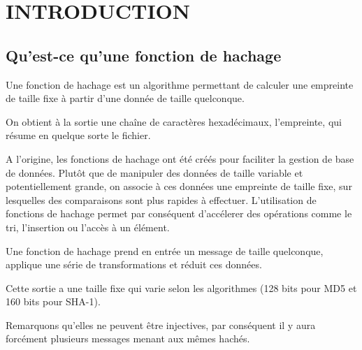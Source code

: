 \documentclass[10.5pt, a4paper, twoside, openright]{report}
\begin{document}
\chapter{INTRODUCTION}
\section{Qu’est-ce qu’une fonction de hachage}
Une fonction de hachage est un algorithme permettant de calculer une empreinte de taille fixe à partir d’une donnée de taille quelconque.

On obtient à la sortie une chaîne de caractères hexadécimaux, l'empreinte, qui résume en quelque sorte le fichier. 

A l’origine, les fonctions de hachage ont été créés pour faciliter la gestion de base de données. Plutôt que de manipuler des données de taille variable et potentiellement grande, on associe à ces données une empreinte de taille fixe, 
sur lesquelles des comparaisons sont plus rapides à effectuer. L’utilisation de fonctions de hachage permet par conséquent d’accélerer des opérations comme le tri, l’insertion ou l’accès à un élément.

Une fonction de hachage prend en entrée un message de taille quelconque, applique une série de transformations et réduit ces données. 

Cette sortie a une taille fixe qui varie selon les algorithmes (128 bits pour MD5 et 160 bits pour SHA-1). 

Remarquons qu’elles ne peuvent être injectives, par conséquent il y aura forcément plusieurs messages menant aux mêmes hachés.
\end{document}
